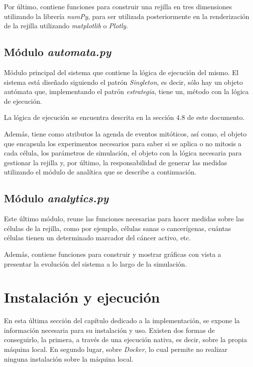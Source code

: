 Por último, contiene funciones para construir una rejilla en tres dimensiones utilizando
la librería \textit{numPy}, para ser utilizada posteriormente en la renderización de la rejilla utilizando \textit{matplotlib}
o \textit{Plotly}.

\subsection{Módulo \textit{automata.py}}

Módulo principal del sistema que contiene la lógica de ejecución del mismo. El sistema
está diseñado siguiendo el patrón \textit{Singleton}, es decir, sólo hay un objeto
autómata que, implementando el patrón \textit{estrategia}, tiene un, método con
la lógica de ejecución.

La lógica de ejecución se encuentra descrita en la sección 4.8 de este documento.

Además, tiene como atributos la agenda de eventos mitóticos, así como, el objeto que
encapsula los experimentos necesarios para saber si se aplica o no mitosis a cada célula, los
parámetros de simulación, el objeto con la lógica necesaria para gestionar la rejilla y, por último,
la responsabilidad de generar las medidas utilizando el módulo de analítica que se describe a continuación.

\subsection{Módulo \textit{analytics.py}}

Este último módulo, reune las funciones necesarias para hacer medidas sobre las células
de la rejilla, como por ejemplo, células sanas o cancerígenas, cuántas células tienen un
determinado marcador del cáncer activo, etc.

Además, contiene funciones para construir y mostrar gráficas con vista a presentar la evolución
del sistema a lo largo de la simulación.

\section{Instalación y ejecución}

En esta última sección del capítulo dedicado a la implementación, se expone la información necesaria
para su instalación y uso. Existen dos formas de conseguirlo, la primera, a través de una ejecución
nativa, es decir, sobre la propia máquina local. En segundo lugar, sobre \textit{Docker}, lo cual permite
no realizar ninguna instalación sobre la máquina local.

